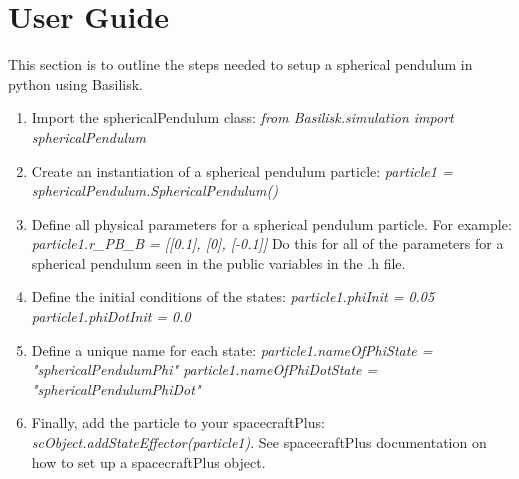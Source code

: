 \section{User Guide}

This section is to outline the steps needed to setup a spherical pendulum in python using Basilisk.

\begin{enumerate}
	\item Import the sphericalPendulum class: \newline \textit{from Basilisk.simulation import sphericalPendulum}
	\item Create an instantiation of a spherical pendulum particle: \newline \textit{particle1 = sphericalPendulum.SphericalPendulum()}
	\item Define all physical parameters for a spherical pendulum particle. For example: \newline
	\textit{particle1.r\_PB\_B = [[0.1], [0], [-0.1]]}
	Do this for all of the parameters for a spherical pendulum seen in the public variables in the .h file.
	\item Define the initial conditions of the states:\newline
	\textit{particle1.phiInit = 0.05 \quad particle1.phiDotInit = 0.0}
	\item Define a unique name for each state:\newline
	\textit{particle1.nameOfPhiState = "sphericalPendulumPhi" \quad particle1.nameOfPhiDotState = "sphericalPendulumPhiDot"}
	\item Finally, add the particle to your spacecraftPlus:\newline
	\textit{scObject.addStateEffector(particle1)}. See spacecraftPlus documentation on how to set up a spacecraftPlus object. 
\end{enumerate}
